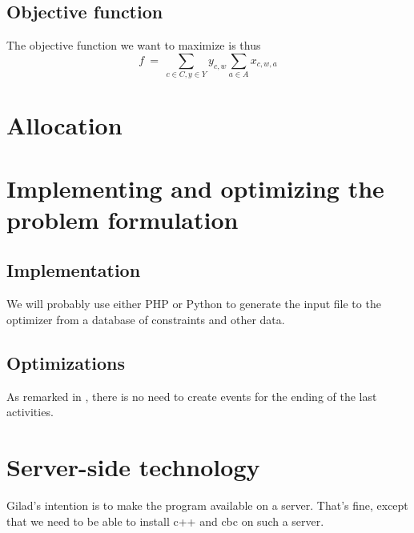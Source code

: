 \documentclass[11pt,reqno]{amsart}
\numberwithin{equation}{section}
\begin{document}
\subsection{Objective function}

The objective function we want to  maximize is thus
\[
   f 
   \ = \
   \sum_{c\in C, y\in Y} y_{c,w} \sum_{a\in A} x_{c,w,a}
\]


\section{Allocation}


\section{Implementing and optimizing the problem formulation}

\subsection{Implementation}

We will probably use either PHP or Python to generate the input file to the optimizer from
a database of constraints and other data.

\subsection{Optimizations}
As remarked in \cite{artigues-etal11}, there is no need to create
events for the ending of the last activities. 

\section{Server-side technology}

Gilad's intention is to make the program available on a server. That's
fine, except that we need to be able to install c++ and cbc on such a server.



\end{document}
